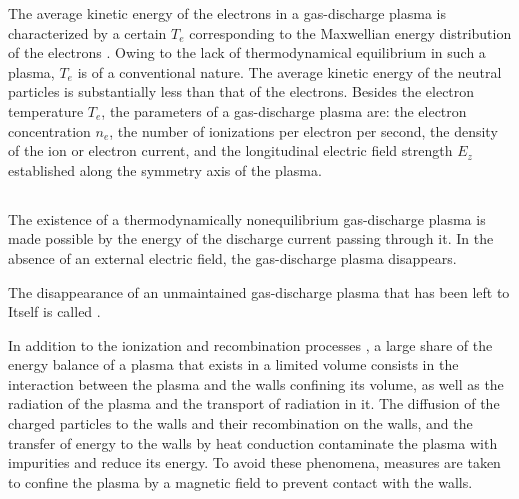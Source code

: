 The average kinetic energy of the electrons in a gas-discharge plasma is characterized by a certain  $T_{e}$ corresponding to the Maxwellian energy distribution of the electrons . Owing to the lack of thermodynamical equilibrium in such a plasma, $T_{e}$ is of a conventional nature. The average kinetic energy of the neutral particles is substantially less than that of the electrons. Besides the electron temperature $T_{e}$, the parameters of a gas-discharge plasma are: the electron concentration $n_{e}$, the number of ionizations per electron per second, the density of the ion or electron current, and the longitudinal electric field strength $E_{z}$ established along the symmetry axis of the plasma.

\subsection{}\label{22.6.7} The existence of a thermodynamically nonequilibrium gas-discharge plasma is made possible by the energy of the discharge current passing through it. In the absence of an external electric field, the gas-discharge plasma disappears.

The disappearance of an unmaintained gas-discharge plasma that has been left to Itself is called .

In addition to the ionization and recombination processes , a large share of the energy balance of a plasma that exists in a limited volume consists in the interaction between the plasma and the walls confining its volume, as well as the radiation of the plasma and the transport of radiation in it. The diffusion of the charged particles to the walls and their recombination on the walls, and the transfer of energy to the walls by heat conduction  contaminate the plasma with impurities and reduce its energy. To avoid these phenomena, measures are taken to confine the plasma by a magnetic field to prevent contact with the walls.

